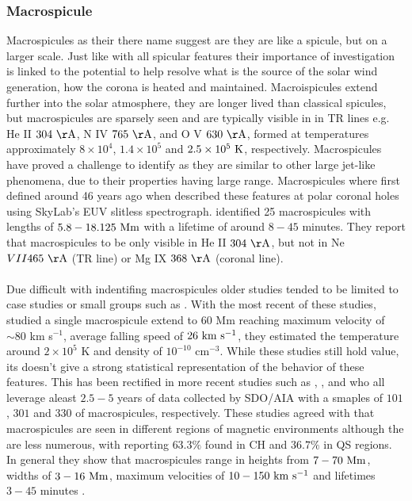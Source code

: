 \documentclass[12pt]{ociamthesis}
\newcommand{\kms}{~\rm{km ~s^{-1}}}
\newcommand{\np}{\\ \\}
\begin{document}
\subsubsection{Macrospicule}
\label{subsec:Mspic}
Macrospicules as their there name suggest are they are like a spicule, but on a larger scale. Just like with all spicular features their importance of investigation is linked to the potential to help resolve what is the source of the solar wind generation, how the corona is heated and maintained. Macroispicules extend further into the solar atmosphere, they are longer lived than classical spicules, but macrospicules are sparsely seen and are typically visible in in TR lines e.g. He II $304~\rm{\AA}$, N IV $765~\rm{\AA}$, and O V $630~\rm{\AA}$, formed at temperatures approximately $8\times10^4$, $1.4\times10^5$ and $2.5\times10^5~\rm{K}$, respectively. Macrospicules have proved a challenge to identify as they are similar to other large jet-like phenomena, due to their properties having large range. Macrospicules where first defined around 46 years ago when \cite{Bohlin1975ApJ197L133B} described these features at polar coronal holes using SkyLab's EUV slitless spectrograph. \cite{Bohlin1975ApJ197L133B} identified 25 macrospicules with lengths of $5.8-18.125~\rm{Mm}$ with a lifetime of around $8-45$ minutes. They report that macrospicules to be only visible in He II $304~\rm{\AA}$, but not in Ne $VII 465~\rm{\AA}$ (TR line) or Mg IX $368~\rm{\AA}$ (coronal line). \np
%
Due difficult with indentifing macrospicules older studies tended to be limited to case studies or small groups such as \citep[][e.g.]{Moe1975SoPh4065K, Bohlin1975ApJ197L133B, Labonte1979SoPh61283L, Pike1997SoPh175457P, Pike1998SoPh182333P, Parenti2002AA384303P}. With the most recent of these studies, \cite{Parenti2002AA384303P} studied a single macrospicule extend to $60$ Mm reaching maximum velocity of $\sim 80$ km s$^{-1}$, average falling speed of $26\kms$, they estimated the temperature around $2\times10^5$ K and density of $10^{-10}$ cm$^{-3}$. While these studies still hold value, its doesn't give a strong statistical representation of the behavior of these features. This has been rectified in more recent studies such as \cite{Bennett2015ApJ808135B}, \cite{Kiss2017ApJ83547K}, and \cite{Loboda2019ApJ871230L} who all leverage aleast $2.5-5$ years of data collected by SDO/AIA with a smaples of $101$, 
$301$ and $330$ of macrospicules, respectively. These studies agreed with \cite{Wang1998ApJ509461W} that macrospicules are seen in different regions of magnetic environments although the are less numerous, with \cite{Loboda2019ApJ871230L} reporting $63.3\%$ found in CH and $36.7\%$ in QS regions. In general they show that macrospicules range in heights from $7- 70~\rm{Mm}$, widths of $3-16~\rm{Mm}$, maximum velocities of $10-150\kms$ and  lifetimes $3-45$ minutes \citep{Bohlin1975ApJ197L133B, Withbroe1976ApJ, Karovska1994ApJ, Parenti2002AA384303P, Bennett2015ApJ808135B, Kiss2017ApJ83547K, Loboda2019ApJ871230L}. \np
\end{document}
